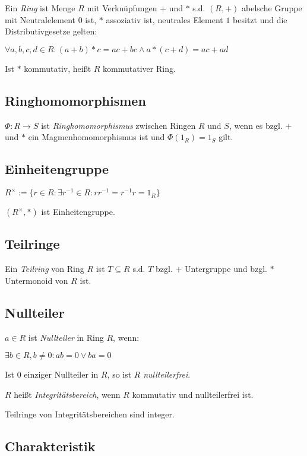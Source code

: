 Ein \emph{Ring} ist Menge $R$ mit Verknüpfungen $+$ und $*$ s.d. $(R,+)$ abelsche Gruppe mit Neutralelement $0$ ist, $*$ assoziativ ist, neutrales Element $1$ besitzt und die Distributivgesetze gelten:

$\forall a, b, c, d \in R : (a+b)*c = ac+bc \land a*(c+d) = ac + ad$

Ist $*$ kommutativ, heißt $R$ kommutativer Ring.

\subsection*{Ringhomomorphismen}

$\Phi : R \to S$ ist \emph{Ringhomomorphismus} zwischen Ringen $R$ und $S$, wenn es bzgl. $+$ und $*$ ein Magmenhomomorphismus ist und $\Phi(1_R) = 1_S$ gilt.

\subsection*{Einheitengruppe}

$R^\times := \{ r \in R : \exists r^{-1} \in R : r r^{-1} = r^{-1} r = 1_R \}$

$(R^\times, *)$ ist Einheitengruppe.

\subsection*{Teilringe}

Ein \emph{Teilring} von Ring $R$ ist $T \subseteq R$ s.d. $T$ bzgl. $+$ Untergruppe und bzgl. $*$ Untermonoid von $R$ ist.

\subsection*{Nullteiler}

$a \in R$ ist \emph{Nullteiler} in Ring $R$, wenn:

$\exists b \in R, b \neq 0 : ab = 0 \lor ba = 0$

Ist $0$ einziger Nullteiler in $R$, so ist $R$ \emph{nullteilerfrei}.

$R$ heißt \emph{Integritätsbereich}, wenn $R$ kommutativ und nullteilerfrei ist.

Teilringe von Integritätsbereichen sind integer.

\subsection*{Charakteristik}

